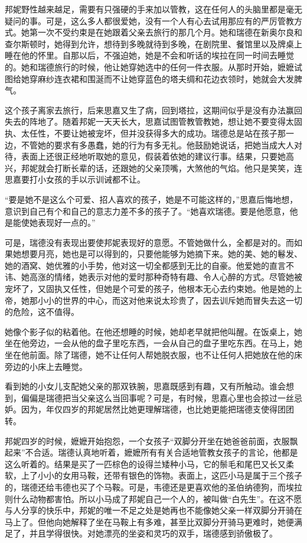 \par 邦妮野性越来越足，需要有只强硬的手来加以管教，这在任何人的头脑里都是毫无疑问的事。可是，这么多人都很爱她，没有一个人有心去试用那应有的严厉管教方式。她第一次不受约束是在她跟着父亲去旅行的那几个月。她和瑞德在新奥尔良和查尔斯顿时，她得到允许，想待到多晚就待到多晚，在剧院里、餐馆里以及牌桌上睡在他的怀里。自那以后，不强迫她，她是不会和听话的埃拉在同一时间去睡觉的。她和瑞德旅行的时候，他让她穿她选中的任何一件衣服。从那时开始，嬷嬷试图给她穿麻纱连衣裙和围涎而不让她穿蓝色的塔夫绸和花边衣领时，她就会大发脾气。
\par 这个孩子离家去旅行，后来思嘉又生了病，回到塔拉，这期间似乎是没有办法赢回失去的阵地了。随着邦妮一天天长大，思嘉试图管教管教她，想让她不要变得太固执、太任性，不要让她被宠坏，但并没获得多大的成功。瑞德总是站在孩子那一边，不管她的要求有多愚蠢，她的行为有多无礼。他鼓励她说话，把她当成大人对待，表面上还很正经地听取她的意见，假装着依她的建议行事。结果，只要她高兴，邦妮就会打断长辈的话，还跟她的父亲顶嘴，大煞他的气焰。他只是笑笑，连思嘉要打小女孩的手以示训诫都不让。
\par “要是她不是这么个可爱、招人喜欢的孩子，她是不可能这样的，”思嘉后悔地想，意识到自己有个和自己的意志力差不多的孩子了。“她喜欢瑞德。要是他愿意，他是能使她表现好一点的。”
\par 可是，瑞德没有表现出要使邦妮表现好的意愿。不管她做什么，全都是对的。而如果她想要月亮，她也是可以得到的，只要他能够为她摘下来。她的美、她的鬈发、她的酒窝、她优雅的小手势，他对这一切全都感到无比的自豪。他爱她的直言不讳、她高涨的情绪，她表示对他的爱时那种奇特有趣、令人心醉的方式。尽管她被宠坏了，又固执又任性，但她是个可爱的孩子，他根本无心去约束她。他是她的上帝，她那小小的世界的中心，而这对他来说太珍贵了，因去训斥她而冒失去这一切的危险，这不值得。
\par 她像个影子似的粘着他。在他还想睡的时候，她却老早就把他叫醒。在饭桌上，她坐在他旁边，一会从他的盘子里吃东西，一会从自己的盘子里吃东西。在马上，她坐在他前面。除了瑞德，她不让任何人帮她脱衣服，也不让任何人把她放在他的床旁边的小床上去睡觉。
\par 看到她的小女儿支配她父亲的那双铁腕，思嘉既感到有趣，又有所触动。谁会想到，偏偏是瑞德把当父亲这么当回事呢？可是，有时候，思嘉心里也会掠过一丝忌妒。因为，年仅四岁的邦妮居然比她更理解瑞德，也比她更能把瑞德支使得团团转。
\par 邦妮四岁的时候，嬷嬷开始抱怨，一个女孩子“双脚分开坐在她爸爸前面，衣服飘起来”不合适。瑞德认真地听着，嬷嬷所有有关合适地管教女孩子的言论，他都是这么听着的。结果是买了一匹棕色的设得兰矮种小马，它的鬃毛和尾巴又长又柔软，上了小小的女用马鞍，还带有银色的饰物。表面上，这匹小马是属于三个孩子的，瑞德还给韦德也买了个马鞍。可是，韦德还是更喜欢他的圣伯纳德狗，而埃拉则什么动物都害怕。所以小马成了邦妮自己一个人的，被叫做“白先生”。在这不愿与人分享的快乐中，邦妮的唯一不足之处是她再也不能像她父亲一样双脚分开骑在马上了。但他向她解释了坐在马鞍上有多难，甚至比双脚分开骑马更难时，她便满足了，并且学得很快。对她漂亮的坐姿和灵巧的双手，瑞德感到骄傲极了。
